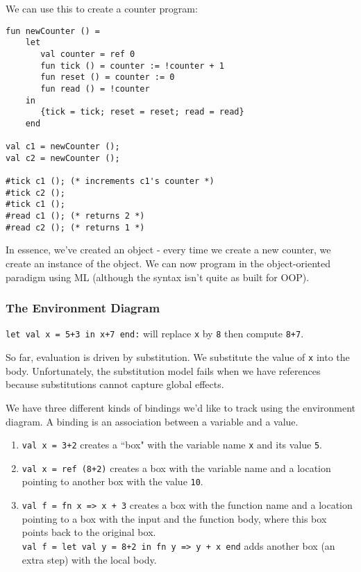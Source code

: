 \documentclass[11pt]{article}
\begin{document}
We can use this to create a counter program:

\begin{verbatim}
fun newCounter () =
    let
	   val counter = ref 0
	   fun tick () = counter := !counter + 1
	   fun reset () = counter := 0
	   fun read () = !counter
    in
	   {tick = tick; reset = reset; read = read}
	end

val c1 = newCounter (); 
val c2 = newCounter ();

#tick c1 (); (* increments c1's counter *)
#tick c2 ();
#tick c1 ();
#read c1 (); (* returns 2 *)
#read c2 (); (* returns 1 *)
\end{verbatim}

In essence, we've created an object - every time we create a new counter, we create an instance of the object. We can now program in the object-oriented paradigm using ML (although the syntax isn't quite as built for OOP).

\subsubsection{The Environment Diagram}

\verb~let val x = 5+3 in x+7 end:~ will replace \verb~x~ by \verb~8~ then compute \verb~8+7~.

So far, evaluation is driven by substitution. We substitute the value of \verb~x~ into the body. Unfortunately, the substitution model fails when we have references because substitutions cannot capture global effects.

We have three different kinds of bindings we'd like to track using the environment diagram. A binding is an association between a variable and a value.
\begin{enumerate}
	\item \verb~val x = 3+2~ creates a ``box" with the variable name \verb~x~ and its value \verb~5~.
	\item \verb~val x = ref (8+2)~ creates a box with the variable name and a location pointing to another box with the value \verb~10~.
	\item \verb~val f = fn x => x + 3~ creates a box with the function name and a location pointing to a box with the input and the function body, where this box points back to the original box. \\
		\verb~val f = let val y = 8+2 in fn y => y + x end~ adds another box (an extra step) with the local body.
\end{enumerate}
\end{document}

